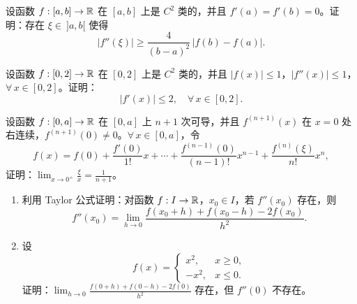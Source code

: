 \begin{exercise}
	\item 设函数 $f:[a,b]\to\mathbb{R}$ 在 $[a,b]$ 上是 $C^2$ 类的，并且 $f'(a)=f'(b)=0$。证明：存在 $\xi\in\ ]a,b[$ 使得
	\[|f''(\xi)|\geqslant\frac4{(b-a)^2}\,|f(b)-f(a)|.\]
\end{exercise}

\begin{exercise}
	\item 设函数 $f:[0,2]\to\mathbb{R}$ 在 $[0,2]$ 上是 $C^2$ 类的，并且 $|f(x)|\leqslant1$，$|f''(x)|\leqslant1$，$\forall\,x\in[0,2]$。证明：
	\[|f'(x)|\leqslant2,\quad\forall\,x\in[0,2].\]
\end{exercise}

\begin{exercise}
	\item 设函数 $f:[0,a]\to\mathbb{R}$ 在 $[0,a]$ 上 $n+1$ 次可导，并且 $f^{(n+1)}(x)$ 在 $x=0$ 处右连续，$f^{(n+1)}(0)\neq0$。$\forall\,x\in[0,a]$，令
	\[f(x)=f(0)+\frac{f'(0)}{1!}x+\cdots+\frac{f^{(n-1)}(0)}{(n-1)!}x^{n-1}+\frac{f^{(n)}(\xi)}{n!}x^n,\]
	证明：$\displaystyle\lim_{x\to0^+}\frac{\xi}{x}=\frac1{n+1}$。
\end{exercise}

\begin{exercise}
	\item
	\begin{enumerate}[label=\arabic*)]
		\item 利用 Taylor 公式证明：对函数 $f:I\to\mathbb{R}$，$x_0\in I$，若 $f''(x_0)$ 存在，则
		\[f''(x_0)=\lim_{h\to0}\frac{f(x_0+h)+f(x_0-h)-2f(x_0)}{h^2}.\]
		\item 设
		\[f(x)=\begin{cases} x^2, & x\geqslant0,\\[1ex] -x^2, & x\leqslant0. \end{cases}\]
		证明：$\displaystyle\lim_{h\to0}\frac{f(0+h)+f(0-h)-2f(0)}{h^2}$ 存在，但 $f''(0)$ 不存在。
	\end{enumerate}
\end{exercise}

